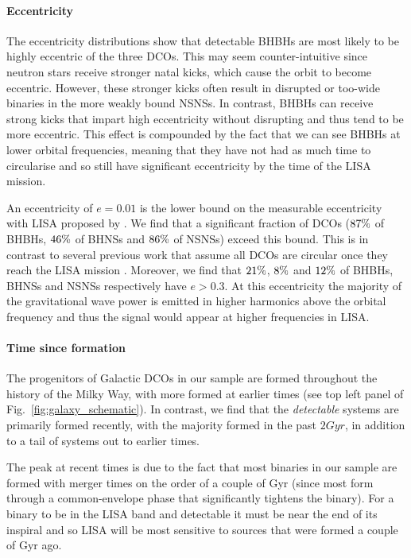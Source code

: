 \paragraph{Eccentricity} The eccentricity distributions show that detectable BHBHs are most likely to be highly eccentric of the three DCOs. This may seem counter-intuitive since neutron stars receive stronger natal kicks, which cause the orbit to become eccentric. However, these stronger kicks often result in disrupted or too-wide binaries in the more weakly bound NSNSs. In contrast, BHBHs can receive strong kicks that impart high eccentricity without disrupting and thus tend to be more eccentric. This effect is compounded by the fact that we can see BHBHs at lower orbital frequencies, meaning that they have not had as much time to circularise and so still have significant eccentricity by the time of the LISA mission.

An eccentricity of $e = 0.01$ is the lower bound on the measurable eccentricity with LISA proposed by \citet{Nishizawa+2016}. We find that a significant fraction of DCOs ($87\%{}$ of BHBHs, $46\%{}$ of BHNSs and $86\%{}$ of NSNSs) exceed this bound. This is in contrast to several previous work that assume all DCOs are circular once they reach the LISA mission \citep[e.g.][]{Lamberts+2018, Sesana+2020}. Moreover, we find that $21\%{}$, $8\%{}$ and $12\%{}$ of BHBHs, BHNSs and NSNSs respectively have $e > 0.3$. At this eccentricity the majority of the gravitational wave power is emitted in higher harmonics above the orbital frequency \citep[Eq.~20]{Peters+1963} and thus the signal would appear at higher frequencies in LISA.

\paragraph{Time since formation} The progenitors of Galactic DCOs in our sample are formed throughout the history of the Milky Way, with more formed at earlier times (see top left panel of Fig.~\ref{fig:galaxy_schematic}). In contrast, we find that the \textit{detectable} systems are primarily formed recently, with the majority formed in the past $2 \unit{Gyr}$, in addition to a tail of systems out to earlier times.

The peak at recent times is due to the fact that most binaries in our sample are formed with merger times on the order of a couple of Gyr (since most form through a common-envelope phase that significantly tightens the binary). For a binary to be in the LISA band and detectable it must be near the end of its inspiral and so LISA will be most sensitive to sources that were formed a couple of Gyr ago.

